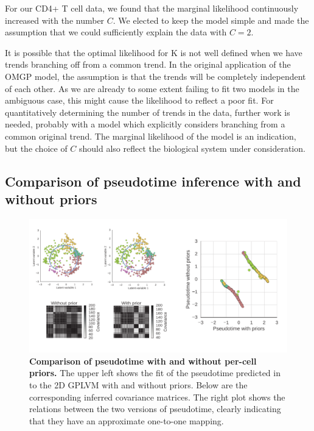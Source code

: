 For our CD4+ T cell data, we found that the marginal likelihood continuously increased with the number $ C $. We elected to keep the model simple and made the assumption that we could sufficiently explain the data with $ C = 2. $

It is possible that the optimal likelihood for K is not well defined when we have trends branching off from a common trend. In the original application of the OMGP model, the assumption is that the trends will be completely independent of each other. As we are already to some extent failing to fit two models in the ambiguous case, this might cause the likelihood to reflect a poor fit. For quantitatively determining the number of trends in the data, further work is needed, probably with a model which explicitly considers branching from a common original trend. The marginal likelihood of the model is an indication, but the choice of $ C $ should also reflect the biological system under consideration.

\subsection{Comparison of pseudotime inference with and without priors}

\begin{figure}
    \centering
    \includegraphics[width=\textwidth]{"fig-priors"}
    \caption[Comparison of pseudotime with and without per-cell priors]{\textbf{Comparison of pseudotime with and without per-cell priors.} The upper left shows the fit of the pseudotime predicted in to the 2D GPLVM with and without priors. Below are the corresponding inferred covariance matrices. The right plot shows the relations between the two versions of pseudotime, clearly indicating that they have an approximate one-to-one mapping.}
    \label{fig:priors}
\end{figure}

